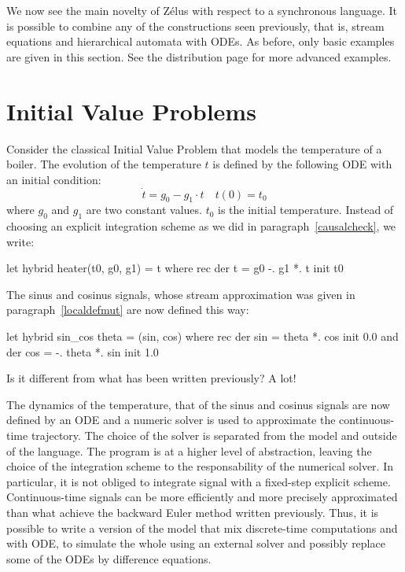 \documentclass[11pt,titlepage,twoside]{report}
\newcommand{\zelus}{{\sf Z\'elus}}
\begin{document}
We now see the main novelty of \zelus{} with respect to a
synchronous language. It is possible to combine any of the
constructions seen previously, that is, stream equations and hierarchical
automata with ODEs. As before, only
basic examples are given in this section. See the distribution page for
more advanced examples.

\section{Initial Value Problems\label{odeinit}} %
Consider the classical Initial Value Problem that models the temperature
of a boiler. The evolution of the temperature $t$ is defined by the following
ODE with an initial condition:
\[
\dot{t} = g_0 - g_1 \cdot t \quad t(0) = t_0
\]
where $g_0$ and $g_1$ are two constant values.
$t_0$ is the initial temperature. Instead
of choosing an explicit integration scheme as we did in
paragraph~\cref{causalcheck}, we write:
\begin{chklisting}[withresult]
let hybrid heater(t0, g0, g1) = t where
  rec der t = g0 -. g1 *. t init t0
\end{chklisting}

The sinus and cosinus signals, whose stream approximation was given in
paragraph~\cref{localdefmut} are now defined this way:
\begin{chklisting}[withresult]
let hybrid sin_cos theta = (sin, cos) where
  rec der sin = theta *. cos init 0.0
  and der cos = -. theta *. sin init 1.0
\end{chklisting}

Is it different from what has been written previously? A lot!

\medskip
The dynamics of the temperature, that of the sinus and cosinus signals
are now defined by an ODE and a
numeric solver is used to approximate the continuous-time
trajectory. The choice of the solver is separated from the model and
outside of the language. The program is at a higher level of
abstraction, leaving the choice of the integration scheme to the
responsability of the numerical solver. In particular, it is not
obliged to integrate signal with a fixed-step explicit
scheme. Continuous-time signals can be more efficiently and more
precisely approximated than what achieve the backward Euler method
written previously. Thus, it is possible to write a version of the
model that mix discrete-time computations and with ODE,
to simulate the whole using an external solver and possibly replace some of the
ODEs by difference equations.
\end{document}
